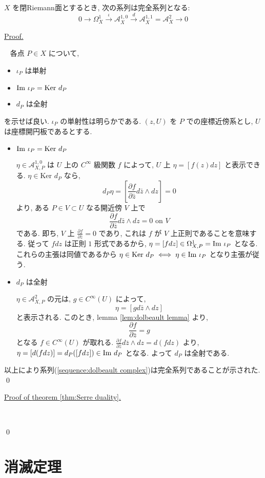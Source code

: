 \documentclass[a4paper,10pt,dvipdfmx]{jsreport}
\newenvironment{prop*}{\refstepcounter{theorem}\begin{itembox}[l]{\underline{Proposition \arabic{chapter}.\arabic{section}.\arabic{theorem}. }}\vspace{-0.5zh}\ }{\end{itembox}}
\renewenvironment{proof}{\begin{flushleft} \underline{Proof.} \end{flushleft}\vspace{-1zh}\ }{\qed\\}
\newenvironment{proofof}[1]{\begin{flushleft} \underline{Proof of {#1}.} \end{flushleft}\vspace{-1zh}\ }{\qed\\}
\newcounter{theorem}[section]
\renewcommand{\Im}[1]{{{\rm Im\ }{#1}}}
\renewcommand{\ker}{\textrm{Ker }}
\theoremstyle{definition}
\begin{document}
\begin{prop*}
    \(X\) を閉Riemann面とするとき, 次の系列は完全系列となる:
    \begin{equation}
        0 \to \Omega_X^1 \xrightarrow{\iota} \mathcal{A}_X ^{1,0} \xrightarrow{d} \mathcal{A}_X^{1,1} = \mathcal{A}_X^2\to 0 \label{sequence:dolbeault complex}
    \end{equation}
\end{prop*}
\begin{proof}
    各点 \(P\in X\) について,
    \begin{itemize}
        \item \(\iota_P\) は単射
        \item \(\Im \iota_P = \ker d_P\)
        \item \(d_P\) は全射
    \end{itemize}
    を示せば良い. \(\iota_P\) の単射性は明らかである. \((z,U)\) を \(P\) での座標近傍系とし, \(U\) は座標開円板であるとする.
    \begin{itemize}
        \item \(\Im \iota_P = \ker d_P\)
        
        \(\eta \in \mathcal{A}_{X,P} ^{1,0}\) は \(U\) 上の \(C^\infty\) 級関数 \(f\) によって, \(U\) 上 \(\eta = [f(z)dz]\) と表示できる. \(\eta \in \ker d_P\) なら,
        \[
            d_P \eta = \left[ \frac{\partial f}{\partial \bar{z}} d\bar{z} \wedge dz \right] = 0
        \]
        より, ある \(P\in V \subset U\) なる開近傍 \(V\) 上で
        \[
            \frac{\partial f}{\partial \bar{z}} d\bar{z} \wedge dz = 0\textrm{ on }V
        \]
        である. 即ち, \(V\) 上 \(\frac{\partial f}{\partial \bar{z}} = 0\) であり, これは \(f\) が \(V\) 上正則であることを意味する. 従って \(fdz\) は正則 \(1\) 形式であるから, \(\eta = [fdz] \in \Omega_{X,P}^1 = \Im \iota_P\) となる. これらの主張は同値であるから \(\eta \in \ker d_P \iff \eta \in \Im \iota_P\) となり主張が従う.

        \item \(d_P\) は全射
        
        \(\eta \in \mathcal{A}_{X, P}^2\) の元は, \(g\in C^\infty(U)\) によって,
        \[
            \eta = [gd\bar{z} \wedge dz]
        \]
        と表示される. このとき, lemma \ref{lem:dolbeault lemma} より,
        \[
            \frac{\partial f}{\partial \bar{z}} = g
        \]
        となる \(f \in C^\infty(U)\) が取れる. \(\frac{\partial f}{\partial \bar{z}} d\bar{z} \wedge dz = d(fdz)\) より, \(\eta = [d(fdz)] = d_P([fdz])\in \Im d_P\) となる. よって \(d_P\) は全射である.
    \end{itemize}
    以上により系列(\ref{sequence:dolbeault complex})は完全系列であることが示された.
\end{proof}


\begin{proofof}{theorem \ref{thm:Serre duality}}

\end{proofof}

\section{消滅定理}
\end{document}
